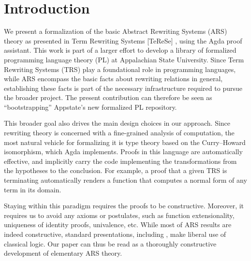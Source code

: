 \section{Introduction}
\label{sec:Introduction}

%


We present a formalization of the basic Abstract Rewriting Systems (ARS) theory as presented in Term Rewriting Systems [TeReSe]
 \cite{Terese}, using the Agda proof assistant.
This work is part of a larger effort to develop a library of formalized programming language theory (PL)
at Appalachian State University.
Since Term Rewriting Systems (TRS) play a foundational role in programming languages,
while ARS encompass the basic facts about rewriting relations in general,
establishing these facts is part of the necessary infrastructure required to
pursue the broader project.  The present contribution can therefore be seen as
``bootstrapping'' Appstate's new formalized PL repository.

This broader goal also drives the main design choices in our approach.
Since rewriting theory is concerned with a fine-grained analysis of computation,
the most natural vehicle for formalizing it is type theory based on the
Curry--Howard isomorphism, which Agda implements.  Proofs in this language
are automatically effective, and implicitly carry the code implementing the
transformations from the hypotheses to the conclusion.  For example,
a proof that a given TRS is terminating automatically renders a function that
computes a normal form of any term in its domain.

Staying within this paradigm requires the proofs to be constructive.
Moreover, it requires us to avoid any axioms or postulates, such as function
extensionality, uniqueness of identity proofs, univalence, etc.
While most of ARS results are indeed constructive, standard presentations,
 including \cite{Terese}, make liberal use of classical logic.
Our paper can thus be read as a thoroughly constructive
development of elementary ARS theory.

